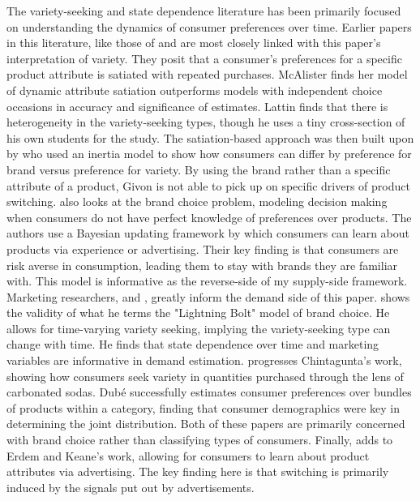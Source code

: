 \documentclass[12pt]{article}
\theoremstyle{definition}
\theoremstyle{remark}
\begin{document}
The variety-seeking and state dependence literature has been primarily focused on understanding the dynamics of consumer preferences over time. Earlier papers in this literature, like those of \citet{mcalister_dynamic_2026} and \citet{lattin_model_1987} are most closely linked with this paper's interpretation of variety. They posit that a consumer's preferences for a specific product attribute is satiated with repeated purchases. McAlister finds her model of dynamic attribute satiation outperforms models with independent choice occasions in accuracy and significance of estimates. Lattin finds that there is heterogeneity in the variety-seeking types, though he uses a tiny cross-section of his own students for the study. The satiation-based approach was then built upon by \citet{givon_variety_1984} who used an inertia model to show how consumers can differ by preference for brand versus preference for variety. By using the brand rather than a specific attribute of a product, Givon is not able to pick up on specific drivers of product switching. \citet{erdem_decision-making_1996} also looks at the brand choice problem, modeling decision making when consumers do not have perfect knowledge of preferences over products. The authors use a Bayesian updating framework by which consumers can learn about products via experience or advertising. Their key finding is that consumers are risk averse in consumption, leading them to stay with brands they are familiar with. This model is informative as the reverse-side of my supply-side framework. Marketing researchers, \citet{chintagunta_variety_1999} and \citet{dube_multiple_2004}, greatly inform the demand side of this paper. \citet{chintagunta_variety_1999} shows the validity of what he terms the "Lightning Bolt" model of brand choice. He allows for time-varying variety seeking, implying the variety-seeking type can change with time. He finds that state dependence over time and marketing variables are informative in demand estimation. \citet{dube_multiple_2004} progresses Chintagunta's work, showing how consumers seek variety in quantities purchased through the lens of carbonated sodas. Dub\'e successfully estimates consumer preferences over bundles of products within a category, finding that consumer demographics were key in determining the joint distribution. Both of these papers are primarily concerned with brand choice rather than classifying types of consumers. Finally, \citet{ackerberg_advertising_2003} adds to Erdem and Keane's work, allowing for consumers to learn about product attributes via advertising. The key finding here is that switching is primarily induced by the signals put out by advertisements.
\end{document}
